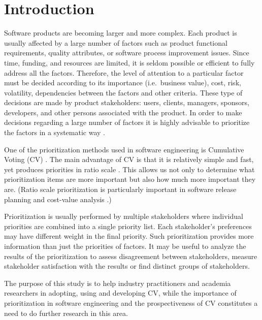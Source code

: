\section{\label{intro}Introduction}

Software products are becoming larger and more complex. Each product
is usually affected by a large number of factors such as product functional
requirements, quality attributes, or software process improvement
issues. Since time, funding, and resources are limited, it is seldom
possible or efficient to fully address all the factors. Therefore,
the level of attention to a particular factor must be decided according
to its importance (i.e.\ business value), cost, risk, volatility, 
dependencies between the factors and other criteria. 
These type of decisions are made by product stakeholders:
users, clients, managers, sponsors, developers, and other persons
associated with the product. In order to make decisions regarding a
large number of factors it is highly advisable to prioritize the factors
in a systematic way \cite{Berander2005}.

One of the prioritization methods used in software engineering is Cumulative Voting (CV) \cite{Leffingwell1999}.
The main advantage of CV is that it is relatively simple and fast, yet produces priorities in ratio scale \cite{Berander2005,Ahl2005}.
This allows us not only to determine what prioritization items are more important but also how much more important they are.
(Ratio scale prioritization is particularly important in software release planning and cost-value analysis \cite{Berander2006a, Karlsson1997}.)

Prioritization is usually performed by multiple stakeholders 
where individual priorities are combined into a single priority list.
Each stakeholder's preferences may have different weight in the final priority.
Such prioritization provides more information than just the priorities of factors.
It may be useful to analyze the results of the prioritization to assess disagreement between stakeholders, measure stakeholder satisfaction with the results or find distinct groups of stakeholders.

The purpose of this study is to help industry practitioners and academia researchers in adopting, using and developing CV, while the importance of prioritization in software engineering and the prospectiveness of CV constitutes a need to do further research in this area.

